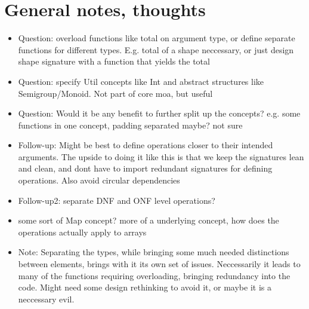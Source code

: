 \documentclass{article}
\begin{document}
\section{General notes, thoughts}

\begin{itemize}
    \item Question: overload functions like total on argument type, or define separate functions for different types. E.g. total of a shape neccessary, or just design shape signature with a function that yields the total
    \item Question: specify Util concepts like Int and abstract structures like Semigroup/Monoid. Not part of core moa, but useful
    \item Question: Would it be any benefit to further split up the concepts? e.g. some functions in one concept, padding separated maybe? not sure
    \item Follow-up: Might be best to define operations closer to their intended arguments. The upside to doing it like this is that we keep the signatures lean and clean, and dont have to import redundant signatures for defining operations. Also avoid circular dependencies
    \item Follow-up2: separate DNF and ONF level operations?
    \item some sort of Map concept? more of a underlying concept, how does the operations actually apply to arrays
    \item Note: Separating the types, while bringing some much needed distinctions between elements, brings with it its own set of issues. Neccessarily it leads to many of the functions requiring overloading, bringing redundancy into the code. Might need some design rethinking to avoid it, or maybe it is a neccessary evil.
\end{itemize}
\end{document}
